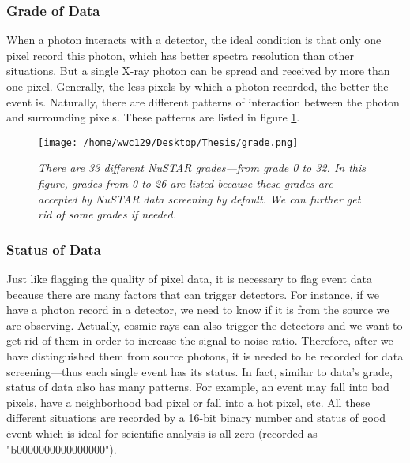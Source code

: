 \documentclass[12pt]{report}
\begin{document}
            \subsubsection{Grade of Data}  
            When a photon interacts with a detector, the ideal condition is that only one pixel record this photon,
            which has better spectra resolution than other situations. 
            But a single X-ray photon can be spread and received by more than one pixel. Generally, the less pixels
            by which a photon recorded, the better the event is. 
            Naturally, there are different patterns of interaction between the
            photon and surrounding pixels. These patterns are listed in figure \ref{fig:nustar_grade}.  
            \begin{figure}[h] 
              \centering
              \texttt{[image: /home/wwc129/Desktop/Thesis/grade.png]}
              \begin{minipage}[c]{0.85\textwidth}
                \caption{\textit{\footnotesize There are 33 different \textit{NuSTAR} grades---from grade 0 to 32.
                          In this figure, grades from 0 to 26 are listed because these grades are accepted by 
                          \textit{NuSTAR} data screening by default. We can further get rid of some grades if needed.}
                          }
              \label{fig:nustar_grade}
              \end{minipage}
              
            \end{figure}


            \subsubsection{Status of Data} 
            Just like flagging the quality of pixel data, it is necessary to flag event data because there are many
            factors that can trigger detectors. For instance, if we have a photon record in a detector, we need to 
            know if it is from the source we are observing. Actually, cosmic rays can also trigger the 
            detectors and we want to get rid of them in order to increase the signal to noise ratio. 
            Therefore, after we have distinguished them from source photons, it is needed to be recorded for data
            screening---thus each single event has its status. In fact, similar to data's grade, status of data also
            has many patterns. For example, an event may fall into bad pixels, have a neighborhood bad pixel
            or fall into a hot pixel, etc. All these different situations are recorded by a 16-bit binary number and
            status of good event which is ideal for scientific analysis is all zero (recorded as "b0000000000000000").
\end{document}
